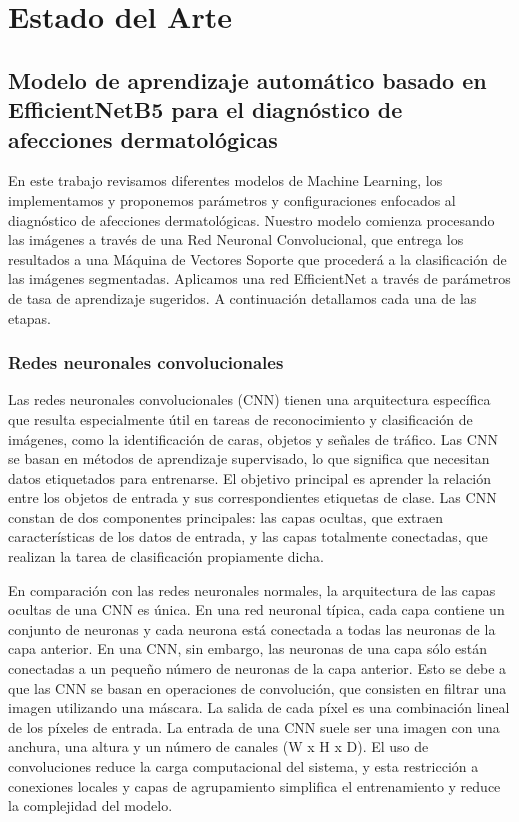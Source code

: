 \chapter{Estado del Arte}\label{chapter:state-of-the-art}

\section{Modelo de aprendizaje automático basado en EfficientNetB5 para el diagnóstico de afecciones dermatológicas}\label{sec:dev}
En este trabajo revisamos diferentes modelos de Machine Learning, los implementamos y proponemos parámetros y configuraciones enfocados al 
diagnóstico de afecciones dermatológicas. 
Nuestro modelo comienza procesando las imágenes a través de una Red Neuronal Convolucional, que entrega los resultados a una Máquina de Vectores 
Soporte que procederá a la clasificación de las imágenes segmentadas. 
Aplicamos una red EfficientNet a través de parámetros de tasa de aprendizaje sugeridos. A continuación detallamos cada una de las etapas. 

	\subsection{Redes neuronales convolucionales}\label{sub:cnn}
Las redes neuronales convolucionales (CNN) tienen una arquitectura específica que resulta especialmente útil en tareas de reconocimiento y 
clasificación de imágenes, como la identificación de caras, objetos y señales de tráfico. 
Las CNN se basan en métodos de aprendizaje supervisado, lo que significa que necesitan datos etiquetados para entrenarse. 
El objetivo principal es aprender la relación entre los objetos de entrada y sus correspondientes etiquetas de clase. 
Las CNN constan de dos componentes principales: las capas ocultas, que extraen características de los datos de entrada, y las capas totalmente 
conectadas, que realizan la tarea de clasificación propiamente dicha.

En comparación con las redes neuronales normales, la arquitectura de las capas ocultas de una CNN es única. 
En una red neuronal típica, cada capa contiene un conjunto de neuronas y cada neurona está conectada a todas las neuronas de la capa anterior. 
En una CNN, sin embargo, las neuronas de una capa sólo están conectadas a un pequeño número de neuronas de la capa anterior. 
Esto se debe a que las CNN se basan en operaciones de convolución, que consisten en filtrar una imagen utilizando una máscara. 
La salida de cada píxel es una combinación lineal de los píxeles de entrada. 
La entrada de una CNN suele ser una imagen con una anchura, una altura y un número de canales (W x H x D). 
El uso de convoluciones reduce la carga computacional del sistema, y esta restricción a conexiones locales y capas de agrupamiento simplifica el 
entrenamiento y reduce la complejidad del modelo.

